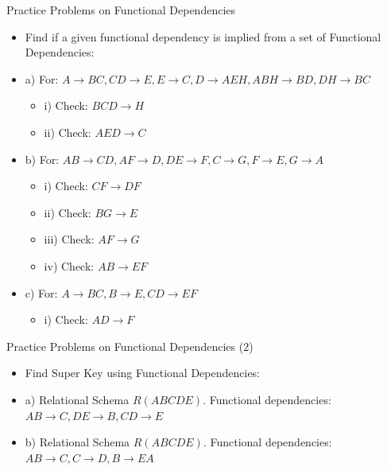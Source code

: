\documentclass[aspectratio=169, xcolor=dvipsnames]{beamer}
\begin{document}
\begin{frame}{Practice Problems on Functional Dependencies}
    \begin{itemize}[<+->]
        \item Find if a given functional dependency is implied from a set of Functional Dependencies:
        \item a) For: $A \rightarrow BC, CD \rightarrow E, E \rightarrow C, D \rightarrow AEH, ABH \rightarrow BD, DH \rightarrow BC$
        \begin{itemize}
            \item[$\triangleright$] i) Check: $BCD \rightarrow H$
            \item[$\triangleright$] ii) Check: $AED \rightarrow C$
        \end{itemize}
        \item b) For: $AB \rightarrow CD, AF \rightarrow D, DE \rightarrow F, C \rightarrow G, F \rightarrow E, G \rightarrow A$
        \begin{itemize}
            \item[$\triangleright$] i) Check: $CF \rightarrow DF$
            \item[$\triangleright$] ii) Check: $BG \rightarrow E$
            \item[$\triangleright$] iii) Check: $AF \rightarrow G$
            \item[$\triangleright$] iv) Check: $AB \rightarrow EF$
        \end{itemize}
        \item c) For: $A \rightarrow BC, B \rightarrow E, CD \rightarrow EF$
        \begin{itemize}
            \item[$\triangleright$] i) Check: $AD \rightarrow F$
        \end{itemize}
    \end{itemize}
\end{frame}

\begin{frame}{Practice Problems on Functional Dependencies (2)}
    \begin{itemize}[<+->]
        \item Find Super Key using Functional Dependencies:
        \item a) Relational Schema $R(ABCDE)$. Functional dependencies: $AB \rightarrow C, DE \rightarrow B, CD \rightarrow E$
        \item b) Relational Schema $R(ABCDE)$. Functional dependencies: $AB \rightarrow C, C \rightarrow D, B \rightarrow EA$
    \end{itemize}
\end{frame}
\end{document}
